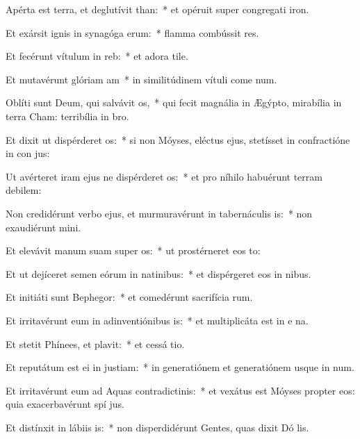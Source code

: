 \item Apérta est terra, et deglutívit than:~* et opéruit super congregati iron.
\item Et exársit ignis in synagóga erum:~* flamma combússit res.
\item Et fecérunt vítulum in reb:~* et adora tile.
\item Et mutavérunt glóriam am~* in similitúdinem vítuli come num.
\item Oblíti sunt Deum, qui salvávit os,~* qui fecit magnália in Ægýpto, mirabília in terra Cham: terribília in  bro.
\item Et dixit ut dispérderet os:~* si non Móyses, eléctus ejus, stetísset in confractióne in con jus:
\item Ut avérteret iram ejus ne dispérderet os:~* et pro níhilo habuérunt terram debilem:
\item Non credidérunt verbo ejus, et murmuravérunt in tabernáculis is:~* non exaudiérunt  mini.
\item Et elevávit manum suam super os:~* ut prostérneret eos  to:
\item Et ut dejíceret semen eórum in natinibus:~* et dispérgeret eos in nibus.
\item Et initiáti sunt Bephegor:~* et comedérunt sacrifícia rum.
\item Et irritavérunt eum in adinventiónibus is:~* et multiplicáta est in e na.
\item Et stetit Phínees, et plavit:~* et cessá tio.
\item Et reputátum est ei in justiam:~* in generatiónem et generatiónem usque in num.
\item Et irritavérunt eum ad Aquas contradictinis:~* et vexátus est Móyses propter eos: quia exacerbavérunt spí jus.
\item Et distínxit in lábiis is:~* non disperdidérunt Gentes, quas dixit Dó lis.
